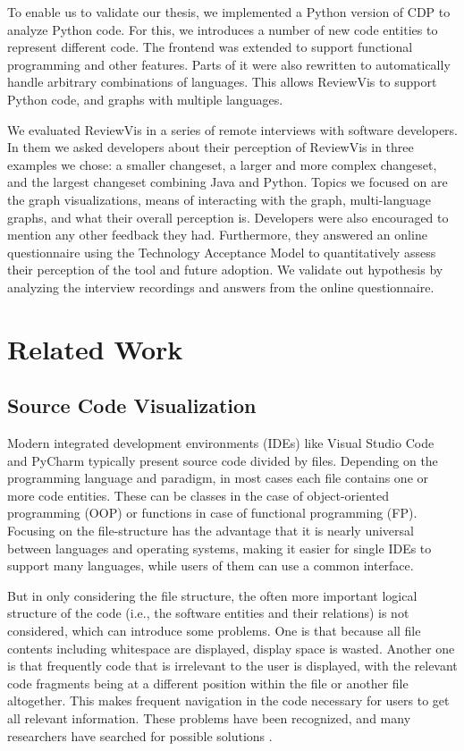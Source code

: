 \documentclass[a4paper,11pt,twoside]{article}
\theoremstyle{definition} %
\renewcommand{\cite}[1]{\citep{#1}}
\begin{document}
To enable us to validate our thesis, we implemented a Python version of CDP to analyze Python code. For this, we introduces a number of new code entities to represent different code. The frontend was extended to support functional programming and other features. Parts of it were also rewritten to automatically handle arbitrary combinations of languages. This allows ReviewVis to support Python code, and graphs with multiple languages.

We evaluated ReviewVis in a series of remote interviews with software developers. In them we asked developers about their perception of ReviewVis in three examples we chose: a smaller changeset, a larger and more complex changeset, and the largest changeset combining Java and Python.
Topics we focused on are the graph visualizations, means of interacting with the graph, multi-language graphs, and what their overall perception is. Developers were also encouraged to mention any other feedback they had.
Furthermore, they answered an online questionnaire using the Technology Acceptance Model to quantitatively assess their perception of the tool and future adoption.
We validate out hypothesis by analyzing the interview recordings and answers from the online questionnaire.

\newpage


\section{Related Work} \label{Sec:RelWork}

\subsection{Source Code Visualization} \label{SubSec:SCVis}

Modern integrated development environments (IDEs) like Visual Studio Code and PyCharm typically present source code divided by files. Depending on the programming language and paradigm, in most cases each file contains one or more code entities. These can be classes in the case of object-oriented programming (OOP) or functions in case of functional programming (FP). Focusing on the file-structure has the advantage that it is nearly universal between languages and operating systems, making it easier for single IDEs to support many languages, while users of them can use a common interface. 

But in only considering the file structure, the often more important logical structure of the code (i.e., the software entities and their relations) is not considered, which can introduce some problems. One is that because all file contents including whitespace are displayed, display space is wasted. Another one is that frequently code that is irrelevant to the user is displayed, with the relevant code fragments being at a different position within the file or another file altogether. This makes frequent navigation in the code necessary for users to get all relevant information. These problems have been recognized, and many researchers have searched for possible solutions \cite{10.1145/1165734.1165736, bragdon2010code, Deline2012}.
\end{document}
